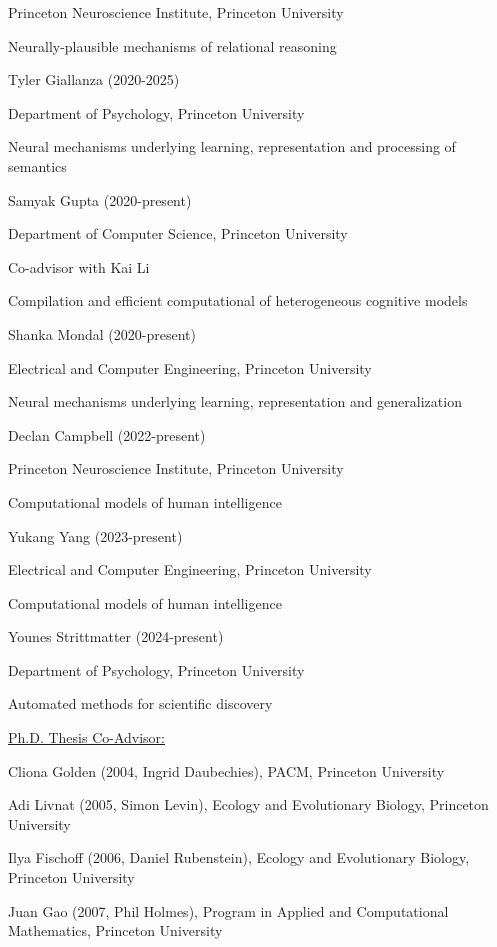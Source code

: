 \documentclass[10 pt]{article}
\begin{document}
Princeton Neuroscience Institute, Princeton University

Neurally-plausible mechanisms of relational reasoning
    \medskip

Tyler Giallanza (2020-2025)

Department of Psychology, Princeton University

Neural mechanisms underlying learning, representation and processing of semantics
    \medskip

Samyak Gupta (2020-present)

Department of Computer Science, Princeton University

Co-advisor with Kai Li

Compilation and efficient computational of heterogeneous cognitive models
    \medskip

Shanka Mondal (2020-present)

Electrical and Computer Engineering, Princeton University

Neural mechanisms underlying learning, representation and generalization
    \medskip

Declan Campbell (2022-present)

Princeton Neuroscience Institute, Princeton University

Computational models of human intelligence
    \medskip

Yukang Yang (2023-present)

Electrical and Computer Engineering, Princeton University

Computational models of human intelligence
    \medskip

Younes Strittmatter (2024-present)

Department of Psychology, Princeton University

Automated methods for scientific discovery
    \medskip


{\fontsize{12pt}{16 pt}\selectfont \underline{Ph.D. Thesis Co-Advisor:}}
    \smallskip

Cliona Golden (2004, Ingrid Daubechies), PACM, Princeton University
    \smallskip

Adi Livnat (2005, Simon Levin), Ecology and Evolutionary Biology, Princeton University
    \smallskip

Ilya Fischoff (2006, Daniel Rubenstein), Ecology and Evolutionary Biology, Princeton University
    \smallskip

Juan Gao (2007, Phil Holmes), Program in Applied and Computational Mathematics, Princeton University
    \smallskip
\end{document}
